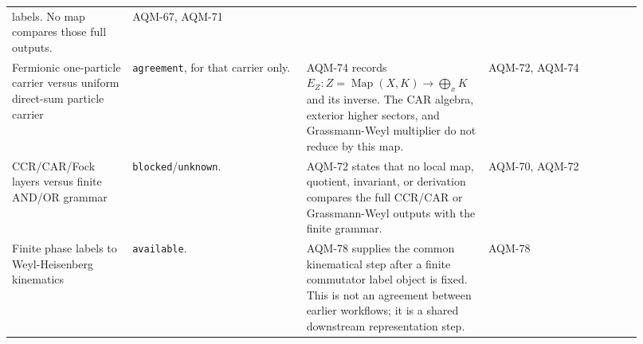 \begin{center}
\begin{tabular}{p{0.18\linewidth}p{0.26\linewidth}p{0.25\linewidth}p{0.23\linewidth}}
labels.  No map compares those full outputs. &
AQM-67, AQM-71 \\
\addlinespace
Fermionic one-particle carrier versus uniform direct-sum particle carrier &
\texttt{agreement}, for that carrier only. &
AQM-74 records \(E_Z:Z=\operatorname{Map}(X,K)\to\bigoplus_xK\) and its
inverse.  The CAR algebra, exterior higher sectors, and Grassmann-Weyl
multiplier do not reduce by this map. &
AQM-72, AQM-74 \\
\addlinespace
CCR/CAR/Fock layers versus finite AND/OR grammar &
\texttt{blocked}/\texttt{unknown}. &
AQM-72 states that no local map, quotient, invariant, or derivation compares
the full CCR/CAR or Grassmann-Weyl outputs with the finite grammar. &
AQM-70, AQM-72 \\
\addlinespace
Finite phase labels to Weyl-Heisenberg kinematics &
\texttt{available}. &
AQM-78 supplies the common kinematical step after a finite commutator label
object is fixed.  This is not an agreement between earlier workflows; it is a
shared downstream representation step. &
AQM-78 \\
\bottomrule
\end{tabular}
\end{center}

